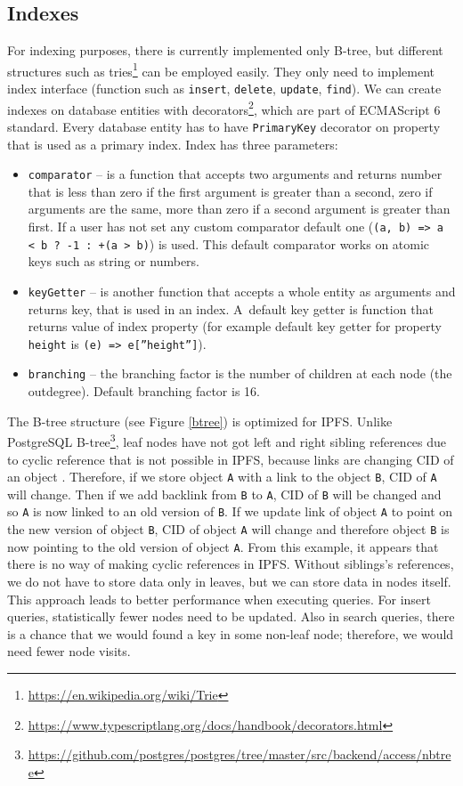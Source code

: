 \subsection{Indexes}
For indexing purposes, there is currently implemented only B-tree, but different structures such as tries\footnote{\url{https://en.wikipedia.org/wiki/Trie}} can be employed easily. They only need to implement index interface (function such as \texttt{insert}, \texttt{delete}, \texttt{update}, \texttt{find}). We can create indexes on database entities with decorators\footnote{\url{https://www.typescriptlang.org/docs/handbook/decorators.html}}, which are part of ECMAScript 6 standard. Every database entity has to have \texttt{PrimaryKey} decorator on property that is used as a primary index. Index has three parameters:
\begin{itemize}
    \item \texttt{comparator} -- is a function that accepts two arguments and returns number that is less than zero if the first argument is greater than a second, zero if arguments are the same, more than zero if a second argument is greater than first. If a user has not set any custom comparator default one (\texttt{(a, b) =>
    a < b ? -1 : +(a > b)}) is used. This default comparator works on atomic keys such as string or numbers. 
    \item \texttt{keyGetter} -- is another function that accepts a whole entity as arguments and returns key, that is used in an index. A~default key getter is function that returns value of index property (for example default key getter for property \texttt{height} is \texttt{(e) =>  e[''height'']}).
    \item \texttt{branching} -- the branching factor is the number of children at each node (the outdegree). Default branching factor is 16.
\end{itemize}

The B-tree structure (see Figure \ref{btree}) is optimized for IPFS. Unlike PostgreSQL B-tree\footnote{\url{https://github.com/postgres/postgres/tree/master/src/backend/access/nbtree}}, leaf nodes have not got left and right sibling references due to cyclic reference that is not possible in IPFS, because links are changing CID of an object \cite{stonebraker1986design}. Therefore, if we store object \texttt{A} with a link to the object \texttt{B}, CID of \texttt{A} will change. Then if we add backlink from \texttt{B} to \texttt{A}, CID of \texttt{B} will be changed and so \texttt{A} is now linked to an old version of \texttt{B}. If we update link of object \texttt{A} to point on the new version of object \texttt{B}, CID of object \texttt{A} will change and therefore object \texttt{B} is now pointing to the old version of object \texttt{A}. From this example, it appears that there is no way of making cyclic references in IPFS. Without siblings's references, we do not have to store data only in leaves, but we can store data in nodes itself. This approach leads to better performance when executing queries. For insert queries, statistically fewer nodes need to be updated. Also in search queries, there is a chance that we would found a key in some non-leaf node; therefore, we would need fewer node visits.


